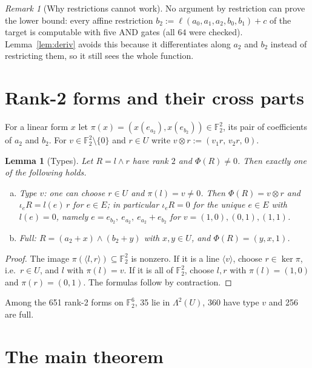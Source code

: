 \documentclass[11pt,a4paper]{article}
\theoremstyle{plain}
\newtheorem{lemma}[theorem]{Lemma}
\theoremstyle{definition}
\theoremstyle{remark}
\newtheorem{remark}[theorem]{Remark}
\newcommand{\F}{\mathbb{F}_2}
\newcommand{\Lam}{\Lambda^{2}}
\newcommand{\Dir}{E}
\begin{document}
\begin{remark}[Why restrictions cannot work]
No argument by restriction can prove the lower bound: every affine restriction $b_2:=\ell(a_0,a_1,a_2,b_0,b_1)+c$ of the target is computable with five AND gates (all $64$ were checked). Lemma~\ref{lem:deriv} avoids this because it differentiates along $a_2$ and $b_2$ instead of restricting them, so it still sees the whole function.
\end{remark}

\section{Rank-2 forms and their cross parts}

For a linear form $x$ let $\pi(x)=(x(e_{a_2}),x(e_{b_2}))\in\F^2$, its pair of coefficients of $a_2$ and $b_2$. For $v\in\F^2\setminus\{0\}$ and $r\in U$ write $v\otimes r:=(v_1r,\,v_2r,\,0)$.

\begin{lemma}[Types]\label{lem:types}
Let $R=l\wedge r$ have rank $2$ and $\Phi(R)\neq0$. Then exactly one of the following holds.
\begin{enumerate}[(a)]
  \item \emph{Type $v$:} one can choose $r\in U$ and $\pi(l)=v\neq0$. Then $\Phi(R)=v\otimes r$ and $\iota_eR=l(e)\,r$ for $e\in\Dir$; in particular $\iota_eR=0$ for the unique $e\in\Dir$ with $l(e)=0$, namely $e=e_{b_2},\ e_{a_2},\ e_{a_2}+e_{b_2}$ for $v=(1,0),(0,1),(1,1)$.
  \item \emph{Full:} $R=(a_2+x)\wedge(b_2+y)$ with $x,y\in U$, and $\Phi(R)=(y,x,1)$.
\end{enumerate}
\end{lemma}

\begin{proof}
The image $\pi(\langle l,r\rangle)\subseteq\F^2$ is nonzero. If it is a line $\langle v\rangle$, choose $r\in\ker\pi$, i.e.\ $r\in U$, and $l$ with $\pi(l)=v$. If it is all of $\F^2$, choose $l,r$ with $\pi(l)=(1,0)$ and $\pi(r)=(0,1)$. The formulas follow by contraction.
\end{proof}

Among the 651 rank-2 forms on $\F^6$, 35 lie in $\Lam(U)$, 360 have type $v$ and 256 are full.

\section{The main theorem}
\end{document}

